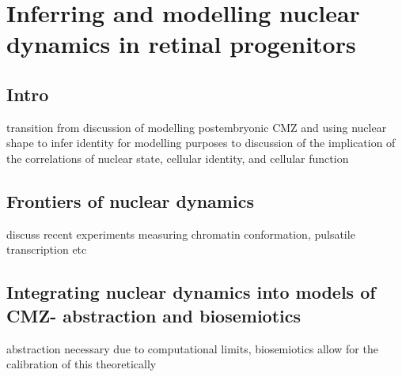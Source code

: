 \chapter{Inferring and modelling nuclear dynamics in retinal progenitors}
\label{chap:rysintro}

\section{Intro}
transition from discussion of modelling postembryonic CMZ and using nuclear shape to infer identity for modelling purposes to discussion of the implication of the correlations of nuclear state, cellular identity, and cellular function

\section{Frontiers of nuclear dynamics}
discuss recent experiments measuring chromatin conformation, pulsatile transcription etc
\section{Integrating nuclear dynamics into models of CMZ- abstraction and biosemiotics}
abstraction necessary due to computational limits, biosemiotics allow for the calibration of this theoretically


